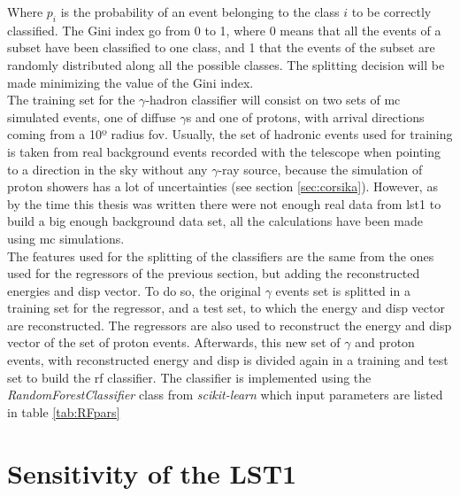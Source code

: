 \documentclass[main.tex]{subfiles}
\begin{document}
Where $p_i$ is the probability of an event belonging to the class $i$ to be correctly classified.  The Gini index go from 0 to 1, where 0 means that all the events of a subset have been classified to one class, and 1 that the events of the subset are randomly distributed along all the possible classes. The splitting decision will be made minimizing the value of the Gini index.\\
The training set for the $\gamma$-hadron classifier will consist on two sets of \gls{mc} simulated events, one of diffuse $\gamma$s and one of protons, with arrival directions coming from a 10º radius \gls{fov}. Usually, the set of hadronic events used for training is taken from real background events recorded with the telescope when pointing to a direction in the sky without any $\gamma$-ray source, because the simulation of proton showers has a lot of uncertainties (see section \ref{sec:corsika}). However, as by the time this thesis was written there were not enough real data from \gls{lst}1 to build a big enough background data set, all the calculations have been made using \gls{mc} simulations.\\
The features used for the splitting of the classifiers are the same from the ones used for the regressors of the previous section, but adding the reconstructed energies and disp vector. To do so, the original $\gamma$ events set is splitted in a training set for the regressor, and a test set, to which the energy and disp vector are reconstructed. The regressors are also used to reconstruct the energy and disp vector of the set of proton events. Afterwards, this new set of $\gamma$ and proton events, with reconstructed energy and disp is divided again in a training and test set to build the \gls{rf} classifier.
The classifier is implemented using the \textit{RandomForestClassifier} class from \textit{scikit-learn} which input parameters are listed in table \ref{tab:RFpars}


\section{Sensitivity of the LST1}
\end{document}
